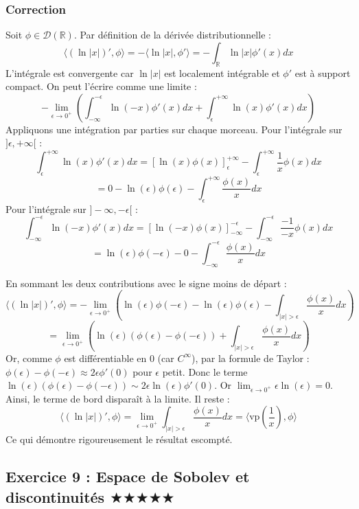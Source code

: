 \documentclass[11pt,a4paper]{article}
\begin{document}
\subsubsection*{Correction}
Soit $\phi \in \mathcal{D}(\mathbb{R})$.
Par définition de la dérivée distributionnelle :
$$ \langle (\ln|x|)', \phi \rangle = - \langle \ln|x|, \phi' \rangle = - \int_{\mathbb{R}} \ln|x| \phi'(x) dx $$
L'intégrale est convergente car $\ln|x|$ est localement intégrable et $\phi'$ est à support compact.
On peut l'écrire comme une limite :
$$ - \lim_{\epsilon \to 0^+} \left( \int_{-\infty}^{-\epsilon} \ln(-x) \phi'(x) dx + \int_{\epsilon}^{+\infty} \ln(x) \phi'(x) dx \right) $$
Appliquons une intégration par parties sur chaque morceau.
Pour l'intégrale sur $]\epsilon, +\infty[$ :
$$ \int_{\epsilon}^{+\infty} \ln(x) \phi'(x) dx = [\ln(x)\phi(x)]_{\epsilon}^{+\infty} - \int_{\epsilon}^{+\infty} \frac{1}{x} \phi(x) dx $$
$$ = 0 - \ln(\epsilon)\phi(\epsilon) - \int_{\epsilon}^{+\infty} \frac{\phi(x)}{x} dx $$
Pour l'intégrale sur $]-\infty, -\epsilon[$ :
$$ \int_{-\infty}^{-\epsilon} \ln(-x) \phi'(x) dx = [\ln(-x)\phi(x)]_{-\infty}^{-\epsilon} - \int_{-\infty}^{-\epsilon} \frac{-1}{-x} \phi(x) dx $$
$$ = \ln(\epsilon)\phi(-\epsilon) - 0 - \int_{-\infty}^{-\epsilon} \frac{\phi(x)}{x} dx $$

En sommant les deux contributions avec le signe moins de départ :
$$ \langle (\ln|x|)', \phi \rangle = - \lim_{\epsilon \to 0^+} \left( \ln(\epsilon)\phi(-\epsilon) - \ln(\epsilon)\phi(\epsilon) - \int_{|x|>\epsilon} \frac{\phi(x)}{x} dx \right) $$
$$ = \lim_{\epsilon \to 0^+} \left( \ln(\epsilon)(\phi(\epsilon) - \phi(-\epsilon)) + \int_{|x|>\epsilon} \frac{\phi(x)}{x} dx \right) $$
Or, comme $\phi$ est différentiable en $0$ (car $C^\infty$), par la formule de Taylor :
$\phi(\epsilon) - \phi(-\epsilon) \approx 2\epsilon \phi'(0)$ pour $\epsilon$ petit.
Donc le terme $\ln(\epsilon)(\phi(\epsilon) - \phi(-\epsilon)) \sim 2\epsilon \ln(\epsilon) \phi'(0)$.
Or $\lim_{\epsilon \to 0^+} \epsilon \ln(\epsilon) = 0$.
Ainsi, le terme de bord disparaît à la limite.
Il reste :
$$ \langle (\ln|x|)', \phi \rangle = \lim_{\epsilon \to 0^+} \int_{|x|>\epsilon} \frac{\phi(x)}{x} dx = \langle \text{vp}\left(\frac{1}{x}\right), \phi \rangle $$
Ce qui démontre rigoureusement le résultat escompté.


\subsection*{Exercice 9 : Espace de Sobolev et discontinuités  \quad$\bigstar\bigstar\bigstar\bigstar\bigstar$}
\end{document}
